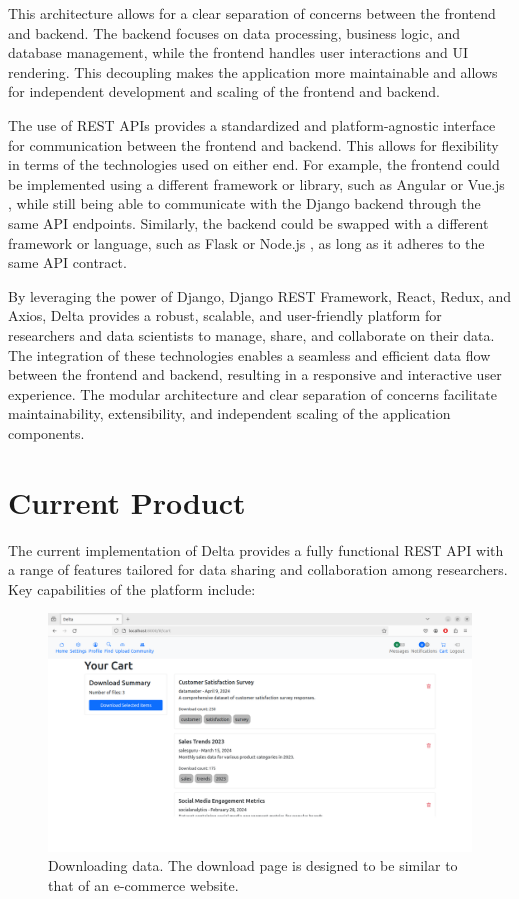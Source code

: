 \documentclass[conference]{IEEEtran}
\begin{document}
This architecture allows for a clear separation of concerns between the frontend and backend. The backend focuses on data processing, business logic, and database management, while the frontend handles user interactions and UI rendering. This decoupling makes the application more maintainable and allows for independent development and scaling of the frontend and backend.

The use of REST APIs provides a standardized and platform-agnostic interface for communication between the frontend and backend. This allows for flexibility in terms of the technologies used on either end. For example, the frontend could be implemented using a different framework or library, such as Angular \cite{angular} or Vue.js \cite{vue}, while still being able to communicate with the Django backend through the same API endpoints. Similarly, the backend could be swapped with a different framework or language, such as Flask \cite{flask} or Node.js \cite{nodejs}, as long as it adheres to the same API contract.

By leveraging the power of Django, Django REST Framework, React, Redux, and Axios, Delta provides a robust, scalable, and user-friendly platform for researchers and data scientists to manage, share, and collaborate on their data. The integration of these technologies enables a seamless and efficient data flow between the frontend and backend, resulting in a responsive and interactive user experience. The modular architecture and clear separation of concerns facilitate maintainability, extensibility, and independent scaling of the application components.
\section{Current Product}
The current implementation of Delta provides a fully functional REST API with a range of features tailored for data sharing and collaboration among researchers. Key capabilities of the platform include:
\begin{figure}[h]
  \centering
  \includegraphics[width=\columnwidth]{figures/cart.png}
  \caption{Downloading data. The download page is designed to be similar to that of an e-commerce website.}
  \label{fig:delta-download}
\end{figure}
\end{document}
